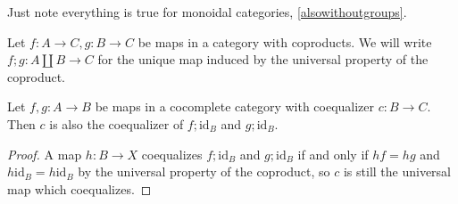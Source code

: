 \documentclass{amsbook} %
\newcommand{\mb}{\mathbf}
\newcommand{\id}{\textrm{id}}
\newcommand{\moncat}{\ensuremath{\mb{MonCat}}}
\numberwithin{section}{chapter}
\begin{document}
%
%

Just note everything is true for monoidal categories, \cref{alsowithoutgroups}.

\begin{nota}\label{plus_notation}
Let $f: A \to C, g: B \to C$ be maps in a category with coproducts. We will write $f;g: A \coprod B \to C$ for the unique map induced by the universal property of the coproduct.
\end{nota}

\begin{lem}\label{sum_coeq}
Let $f, g: A \to B$ be maps in a cocomplete category with coequalizer $c: B \to C$. Then $c$ is also the coequalizer of $f;\id_B$ and $g; \id_B$.
\end{lem}
\begin{proof}
A map $h: B \to X$ coequalizes $f;\id_B$ and $g; \id_B$ if and only if $hf = hg$ and $h \id_B = h \id_B$ by the universal property of the coproduct, so $c$ is still the universal map which coequalizes.

\end{proof}
\end{document}
